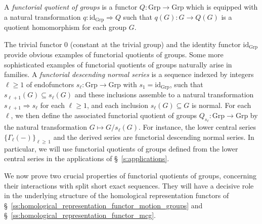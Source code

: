 \documentclass[AHL,Unicode,published]{cedram}
\newcommand{\id}{\mathrm{id}}
\newcommand{\groups}{\ensuremath{\mathrm{Grp}}}
\newcommand{\LCS}{\varGamma}
\renewcommand{\geq}{\geqslant}
\begin{document}
\begin{defi}\label{def:functorial_quotient_group}
A \emph{functorial quotient of groups} is a functor $Q \colon \groups \to \groups$ which is equipped with a natural transformation $q \colon \id_{\groups} \Rightarrow Q$ such that $q(G) \colon G \to Q(G)$ is a quotient homomorphism for each group $G$.
\end{defi}

\begin{exam}\label{eg:examples_FQG}
The trivial functor $0$ (constant at the trivial group) and the identity functor $\id_{\groups}$ provide obvious examples of functorial quotients of groups. Some more sophisticated examples of functorial quotients of groups naturally arise in families. A \emph{functorial descending normal series} is a sequence indexed by integers $\ell\geq 1$ of endofunctors $s_{\ell} \colon \groups \to \groups$ with $s_{1} = \id_\groups$, such that $s_{\ell + 1}(G) \subseteq s_{\ell}(G)$ and these inclusions assemble to a natural transformation $s_{\ell + 1} \Rightarrow s_{\ell}$ for each $\ell\geq 1$, and each inclusion $s_{\ell}(G) \subseteq G$ is normal. For each $\ell$, we then define the associated functorial quotient of groups $Q_{s_{\ell}} \colon \groups \to \groups$ by the natural transformation $G \mapsto G/s_{\ell}(G)$. For instance, the lower central series $\{ \LCS_{\ell}(-)\} _{\ell\geq\,1}$ and the derived series are functorial descending normal series. In particular, we will use functorial quotients of groups defined from the lower central series in the applications of \S~\ref{s:applications}.
\end{exam}

We now prove two crucial properties of functorial quotients of groups, concerning their interactions with split short exact sequences. They will have a decisive role in the underlying structure of the homological representation functors of \S~\ref{ss:homological_representation_functor_motion_groups} and \S~\ref{ss:homological_representation_functor_mcg}.
\end{document}
